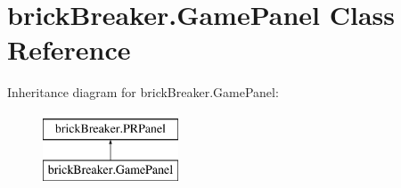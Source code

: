 \hypertarget{classbrick_breaker_1_1_game_panel}{
\section{brickBreaker.GamePanel Class Reference}
\label{classbrick_breaker_1_1_game_panel}
}
Inheritance diagram for brickBreaker.GamePanel:\begin{figure}[H]
\begin{center}
\leavevmode
\includegraphics[height=2cm]{classbrick_breaker_1_1_game_panel}
\end{center}
\end{figure}

